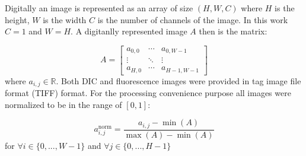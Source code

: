 Digitally an image is represented as an array of size $(H, W, C)$ where $H$ is the height, $W$ is the width $C$ is the number of channels of the image. In this work $C = 1$ and $W = H$. A digitanlly represented image $A$ then is the matrix:

\begin{equation}
    A = \left[
            \begin{array}{ccc}
                a_{0,0} & \cdots & a_{0,W-1} \\
                \vdots & \ddots & \vdots \\
                a_{H, 0} & \cdots & a_{H-1, W-1}
            \end{array}
        \right]
\end{equation}
where $a_{i, j} \in \mathbb{R}$. Both DIC and fluorescence images were provided in tag image file format (TIFF) format. For the processing convenience purpose all images were normalized to be in the range of $[0, 1]$:

\begin{equation}
    a^{\text{norm}}_{i,j} = \frac{a_{i, j} - \min(A)}{\max(A) - \min(A)}
\end{equation}
for $ \forall i \in \{0, ..., W - 1\}$ and $ \forall j \in \{0, ..., H - 1\}$
